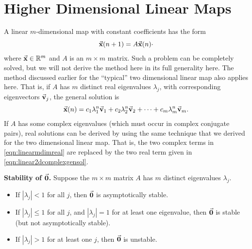 \newpage

\section{Higher Dimensional Linear Maps}
%

A linear $m$-dimensional map with constant coefficients has the form
\begin{equation}
  \vec{\textbf{x}}(n+1) = A\vec{\textbf{x}}(n)
\label{eqn:linearmapmdim}\cdot
\end{equation}
where $\vec{\textbf{x}}\in \mathbb{R}^m$ and $A$ is an $m\times m$ matrix.
Such a problem can be completely solved, but we will not
derive the method here in its full generality here.
The method discussed earlier for the
``typical'' two dimensional linear map also applies here.
That is, if $A$ has $m$ distinct real eigenvalues
$\lambda_j$, with corresponding eigenvectors
$\vec{\textbf{v}}_j$, the general solution is
\begin{equation}
   \vec{\textbf{x}}(n) = c_1 \lambda_1^n \vec{\textbf{v}}_1 + c_2 \lambda_2^n \vec{\textbf{v}}_2
                 + \cdots + c_m \lambda_m^n\vec{\textbf{v}}_m.
\label{eqn:linearmdimreal}
\end{equation}
%
If $A$ has some complex eigenvalues (which must occur in
complex conjugate pairs), real solutions can be derived
by using the same technique that we derived for the
two dimensional linear map.
That is, the two complex terms in \eqref{eqn:linearmdimreal}
are replaced by the two real term given in
\eqref{eqn:linear2dcomplexgensol}.

\medskip
\noindent
\textbf{Stability of $\vec{\textbf{0}}$.}
Suppose the $m\times m$ matrix $A$ has $m$ distinct eigenvalues $\lambda_j$.
\begin{itemize}
\item If $|\lambda_j| < 1$ for all $j$, then
$\vec{\textbf{0}}$ is asymptotically stable.
\item If $|\lambda_j| \le 1$ for all $j$,
and $|\lambda_j|=1$ for at least one eigenvalue, then
$\vec{\textbf{0}}$ is stable (but not asymptotically stable).
\item If $|\lambda_j| > 1$ for at least one $j$,
then $\vec{\textbf{0}}$ is unstable.
\end{itemize}



